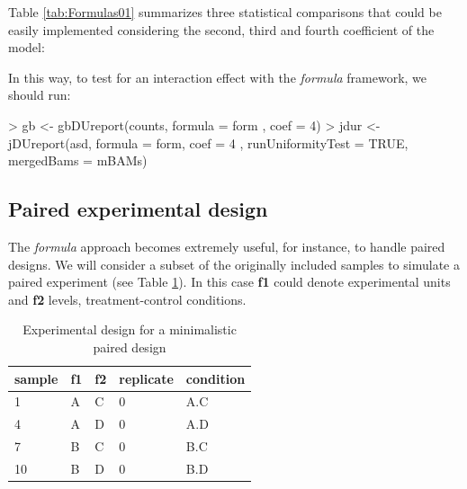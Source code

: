 \documentclass{article}
\begin{document}
Table \ref{tab:Formulas01} summarizes three statistical comparisons that could be easily implemented considering the second, third and fourth coefficient of the model:

\begin{table}[H]
  \noindent{}
  \caption{Experimental design of the example data set.}
  \label{tab:Formulas01}
\end{table}

In this way, to test for an interaction effect with the {\em formula} framework, we should run:

\begin{Schunk}
\begin{Sinput}
> gb      <- gbDUreport(counts, formula = form , coef = 4)
> jdur    <- jDUreport(asd, formula = form, coef = 4 ,
                      runUniformityTest = TRUE,
                      mergedBams = mBAMs)
\end{Sinput}
\end{Schunk}

\subsection{Paired experimental design}

The {\em formula} approach becomes extremely useful, for instance, to handle paired designs.
We will consider a subset of the originally included samples to simulate a paired experiment (see Table \ref{tab:ExPaired}). In this case \textbf{f1} could denote experimental units and \textbf{f2} levels, treatment-control conditions. 

\begin{table}[H]
  \begin{center}
    \begin{tabular}{lllll}
    sample   & f1 & f2 & replicate & condition \\ \hline
    1        & A  & C  & 0         & A.C       \\
    4        & A  & D  & 0         & A.D       \\
    7        & B  & C  & 0         & B.C       \\
    10       & B  & D  & 0         & B.D       \\
    \end{tabular}
  \end{center}
  \caption{Experimental design for a minimalistic paired design}
  \label{tab:ExPaired}
\end{table}
\end{document}
